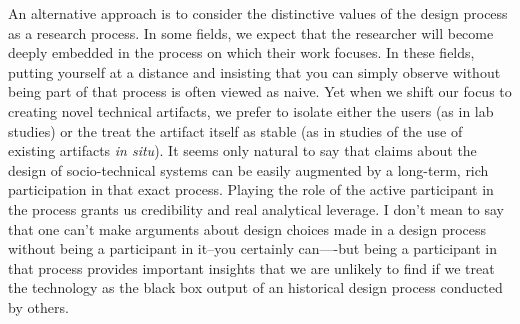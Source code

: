
An alternative approach is to consider the distinctive values of the design process as a research process. In some fields, we expect that the researcher will become deeply embedded in the process on which their work focuses. In these fields, putting yourself at a distance and insisting that you can simply observe without being part of that process is often viewed as naive. Yet when we shift our focus to creating novel technical artifacts, we prefer to isolate either the users (as in lab studies) or the treat the artifact itself as stable (as in studies of the use of existing artifacts \emph{in situ}). It seems only natural to say that claims about the design of socio-technical systems can be easily augmented by a long-term, rich participation in that exact process. Playing the role of the active participant in the process grants us credibility and real analytical leverage. I don't mean to say that one can't make arguments about design choices made in a design process without being a participant in it--you certainly can—-but being a participant in that process provides important insights that we are unlikely to find if we treat the technology as the black box output of an historical design process conducted by others. 



